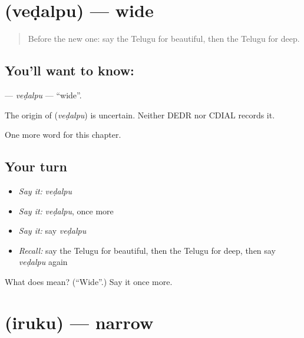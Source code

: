 \section[\texorpdfstring{\te{వెడల్పు} (veḍalpu)}{వెడల్పు (veḍalpu)}]{ (veḍalpu) — wide}

\label{lesson:TE-C138-vedalpu}



\begin{quote}
Before the new one: say the Telugu for beautiful, then the Telugu for deep.
\end{quote}

\subsection*{You'll want to know: }
\textbf{} — \emph{veḍalpu} — \textquotedblleft{}wide\textquotedblright{}.

\begin{cousinweb}
The origin of \textbf{} (\emph{veḍalpu}) is uncertain. Neither DEDR nor CDIAL records it.
\end{cousinweb}

\begin{grammarlens}[title={What you've built}]
One more word for this chapter.
\end{grammarlens}

\subsection*{Your turn}
\begin{itemize}
\raggedright
  \item \emph{Say it:} \emph{veḍalpu}
  \item \emph{Say it:} \emph{veḍalpu}, once more
  \item \emph{Say it:} say \emph{veḍalpu}
  \item \emph{Recall:} say the Telugu for beautiful, then the Telugu for deep, then say \emph{veḍalpu} again
\end{itemize}

\begin{tcolorbox}[breakable,colback=teal!4,colframe=teal!35!black,title={Before you move on}]
What does  mean? (\textquotedblleft{}Wide\textquotedblright{}.) Say it once more.
\end{tcolorbox}
\section[\texorpdfstring{\te{ఇరుకు} (iruku)}{ఇరుకు (iruku)}]{ (iruku) — narrow}

